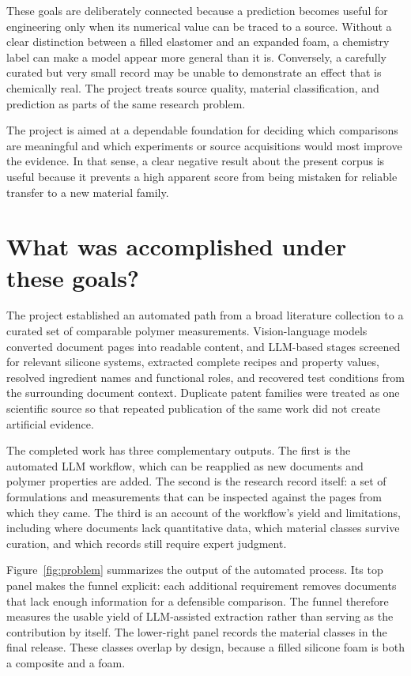 \documentclass[10pt]{article}
\begin{document}
These goals are deliberately connected because a prediction becomes useful for
engineering only when its numerical value can be traced to a source. Without a
clear distinction between a filled elastomer and an expanded foam, a chemistry
label can make a model appear more general than it is. Conversely, a carefully
curated but very small record may be unable to demonstrate an effect that is
chemically real. The project treats source quality, material classification,
and prediction as parts of the same research problem.

The project is aimed at a dependable foundation for deciding which comparisons
are meaningful and which experiments or source acquisitions would most improve
the evidence. In that sense, a clear negative result about the present corpus
is useful because it prevents a high apparent score from being mistaken for
reliable transfer to a new material family.

\section{What was accomplished under these goals?}
The project established an automated path from a broad literature collection
to a curated set of comparable polymer measurements. Vision-language models
converted document pages into readable content, and LLM-based stages screened
for relevant silicone systems, extracted complete recipes and property values,
resolved ingredient names and functional roles, and recovered test conditions
from the surrounding document context. Duplicate patent families were treated
as one scientific source so that repeated publication of the same work did not
create artificial evidence.

The completed work has three complementary outputs. The first is the automated
LLM workflow, which can be reapplied as new documents and polymer properties
are added. The second is the research record itself: a set of formulations and
measurements that can be inspected against the pages from which they came. The
third is an account of the workflow's yield and limitations, including where
documents lack quantitative data, which material classes survive curation, and
which records still require expert judgment.

Figure~\ref{fig:problem} summarizes the output of the automated process. Its
top panel makes the funnel explicit: each additional requirement removes
documents that lack enough information for a defensible comparison. The funnel
therefore measures the usable yield of LLM-assisted extraction rather than
serving as the contribution by itself. The lower-right panel records the
material classes in the final release. These classes overlap by design, because
a filled silicone foam is both a composite and a foam.
\end{document}
